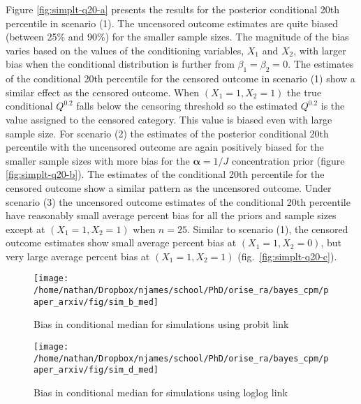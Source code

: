 \documentclass[
]{article}
\begin{document}
Figure \ref{fig:simplt-q20-a} presents the results for the posterior conditional 20th percentile in scenario (1). The uncensored outcome estimates are quite biased (between 25\% and 90\%) for the smaller sample sizes. The magnitude of the bias varies based on the values of the conditioning variables, \(X_1\) and \(X_2\), with larger bias when the conditional distribution is further from \(\beta_1 = \beta_2 = 0\). The estimates of the conditional 20th percentile for the censored outcome in scenario (1) show a similar effect as the censored outcome. When \((X_1=1,X_2=1)\) the true conditional \(Q^{0.2}\) falls below the censoring threshold so the estimated \(Q^{0.2}\) is the value assigned to the censored category. This value is biased even with large sample size. For scenario (2) the estimates of the posterior conditional 20th percentile with the uncensored outcome are again positively biased for the smaller sample sizes with more bias for the \(\boldsymbol{\alpha}=1/J\) concentration prior (figure \ref{fig:simplt-q20-b}). The estimates of the conditional 20th percentile for the censored outcome show a similar pattern as the uncensored outcome. Under scenario (3) the uncensored outcome estimates of the conditional 20th percentile have reasonably small average percent bias for all the priors and sample sizes except at \((X_1=1,X_2=1)\) when \(n=25\). Similar to scenario (1), the censored outcome estimates show small average percent bias at \((X_1=1,X_2=0)\), but very large average percent bias at \((X_1=1,X_2=1)\) (fig.~\ref{fig:simplt-q20-c}).

\begin{figure}

{\centering \texttt{[image: /home/nathan/Dropbox/njames/school/PhD/orise\_ra/bayes\_cpm/paper\_arxiv/fig/sim\_b\_med]} 

}

\caption{Bias in conditional median for simulations using probit link}\label{fig:simplt-med-1}
\end{figure}

\begin{figure}

{\centering \texttt{[image: /home/nathan/Dropbox/njames/school/PhD/orise\_ra/bayes\_cpm/paper\_arxiv/fig/sim\_d\_med]} 

}

\caption{Bias in conditional median for simulations using loglog link}\label{fig:simplt-med-3}
\end{figure}
\end{document}
